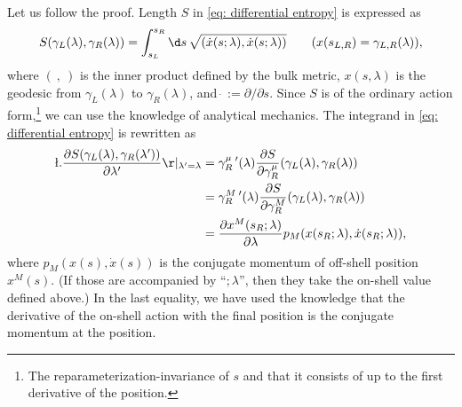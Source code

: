 \documentclass[12pt]{article}
\begin{document}
Let us follow the proof.
Length $S$ in \eqref{eq: differential entropy} is expressed as
\begin{align}
	S(\gamma_L(\lambda),\gamma_R(\lambda))
	=
	\int_{s_L}^{s_R}\d s\,\sqrt{(\dot x(s;\lambda),\dot x(s;\lambda))}
	\qquad
	(x(s_{L,R}) = \gamma_{L,R}(\lambda)),\label{eq: action}
\end{align}
where $(~,~)$ is the inner product defined by the bulk metric, $x(s,\lambda)$ is the geodesic from $\gamma_L(\lambda)$ to $\gamma_R(\lambda)$, and $\dot~ := \partial /\partial s$.
Since $S$ is of the ordinary action form,\footnote{
The reparameterization-invariance of $s$ and that it consists of up to the first derivative of the position.
}
we can use the knowledge of analytical mechanics.
The integrand in \eqref{eq: differential entropy} is rewritten as
\begin{align}
	 \l.\frac{\partial S(\gamma_L(\lambda),\gamma_R(\lambda'))}{\partial \lambda'}\r|_{\lambda' = \lambda}
	 &=
	 \gamma_R^\mu\,'(\lambda)
	  \frac{\partial S}{\partial \gamma_R^\mu}(\gamma_L(\lambda),\gamma_R(\lambda))\nonumber\\
	  &=
	  \gamma_R^M\,'(\lambda)
	  \frac{\partial S}{\partial \gamma_R^M}(\gamma_L(\lambda),\gamma_R(\lambda))\nonumber\\
	  &=
	  \frac{\partial x^M(s_R;\lambda)}{\partial\lambda} p_M(x(s_R;\lambda),\dot x(s_R;\lambda)),
\end{align}
where $p_M(x(s),\dot x(s))$ is the conjugate momentum of off-shell position $x^M(s)$. (If those are accompanied by ``$;\lambda$'', then they take the on-shell value defined above.) In the last equality, we have used the knowledge that the derivative of the on-shell action with the final position is the conjugate momentum at the position.
\end{document}
